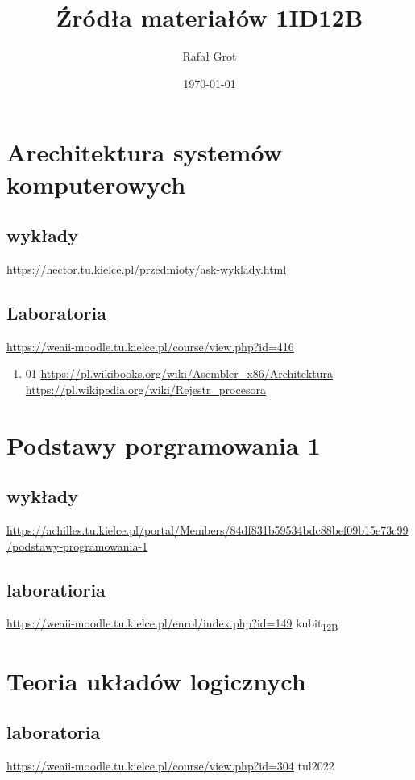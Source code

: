 \documentclass[11pt]{article}
\author{Rafał Grot}
\date{\today}
\title{Źródła materiałów 1ID12B}
\begin{document}
\maketitle
\tableofcontents


\section{Arechitektura systemów komputerowych}
\label{sec:org944d7db}
\subsection{wykłady}
\label{sec:orgceec16b}
\url{https://hector.tu.kielce.pl/przedmioty/ask-wyklady.html}
\subsection{Laboratoria}
\label{sec:org256df9b}
\url{https://weaii-moodle.tu.kielce.pl/course/view.php?id=416}
\begin{enumerate}
\item 01
\label{sec:org22b1369}
\url{https://pl.wikibooks.org/wiki/Asembler\_x86/Architektura}
\url{https://pl.wikipedia.org/wiki/Rejestr\_procesora}
\end{enumerate}
\section{Podstawy porgramowania 1}
\label{sec:orgc128d92}
\subsection{wykłady}
\label{sec:org0c2602e}
\url{https://achilles.tu.kielce.pl/portal/Members/84df831b59534bdc88bef09b15e73c99/podstawy-programowania-1}
\subsection{laboratioria}
\label{sec:orgffe6c88}
\url{https://weaii-moodle.tu.kielce.pl/enrol/index.php?id=149} kubit\textsubscript{12B}
\section{Teoria układów logicznych}
\label{sec:org38e21e9}
\subsection{laboratoria}
\label{sec:orgeb434e9}
\url{https://weaii-moodle.tu.kielce.pl/course/view.php?id=304} tul2022
\end{document}
